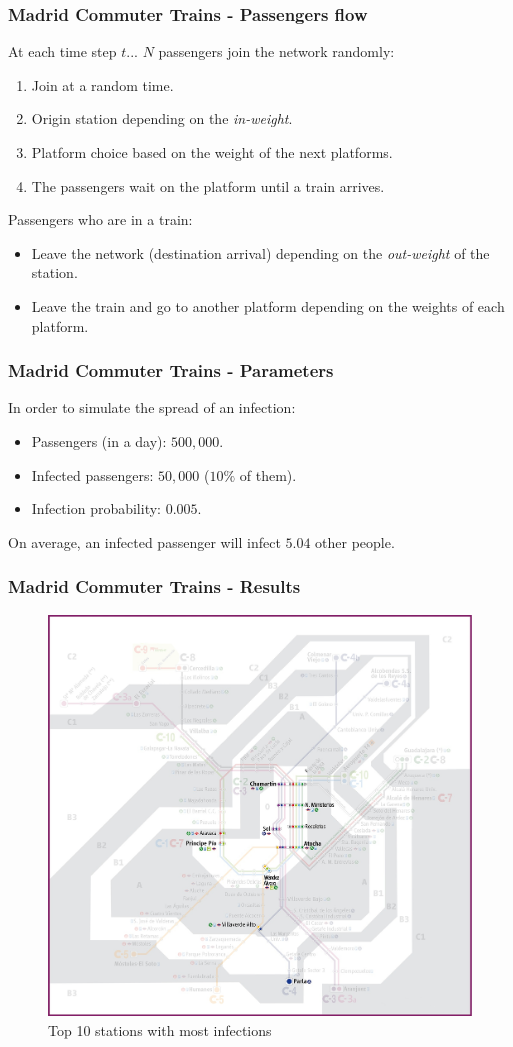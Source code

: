 \documentclass{beamer}
\begin{document}
\begin{frame}
\frametitle{Madrid Commuter Trains - Passengers flow}
At each time step $t$...\linebreak
\linebreak
$N$ passengers join the network randomly:
\begin{enumerate}
	\item Join at a random time.
	\item Origin station depending on the \textit{in-weight}.
	\item Platform choice based on the weight of the next platforms.
	\item The passengers wait on the platform until a train arrives.
\end{enumerate}
Passengers who are in a train:
\begin{itemize}
\item Leave the network (destination arrival) depending on the \textit{out-weight} of the station.
\item Leave the train and go to another platform depending on the weights of each platform.
\end{itemize}
\end{frame}
\begin{frame}
\frametitle{Madrid Commuter Trains - Parameters}
In order to simulate the spread of an infection:
\begin{itemize}
	\item Passengers (in a day): $500,000$.
	\item Infected passengers: $50,000$ ($10\%$ of them).
	\item Infection probability: $0.005$.
\end{itemize}
On average, an infected passenger will infect $5.04$ other people.
\end{frame}
\begin{frame}
\frametitle{Madrid Commuter Trains - Results}
\begin{figure}
	\centering
	\includegraphics[width=.5\linewidth]{Scratch_Visuals/madrid-cercanias-map-top10.png}
	\caption{Top 10 stations with most infections}
\end{figure}
\end{frame}
\end{document}
